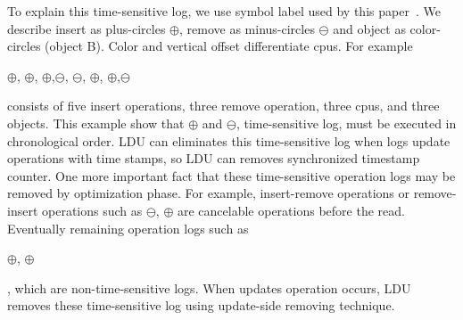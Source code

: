 To explain this time-sensitive log, we use symbol label used by this
paper~\cite{Clements15SCR}.
We describe insert as plus-circles $\oplus$, remove as minus-circles
$\ominus$ and object as color-circles (object B). 
Color and vertical offset differentiate cpus.
For example
\begin{center}
$\oplus$, $\oplus$, $\oplus$,$\ominus$,
$\ominus$, $\oplus$, $\oplus$,$\ominus$
\end{center}
consists of five insert operations, three remove operation, three cpus, and
three objects.
This example show that $\oplus$ and $\ominus$,
time-sensitive log, must be executed in chronological order.
LDU can eliminates this time-sensitive log when logs update operations with time
stamps, so LDU can removes synchronized timestamp counter.
One more important fact that these time-sensitive operation logs may be removed
by optimization phase.
For example, insert-remove operations or remove-insert operations such as 
$\ominus$, $\oplus$ are cancelable operations before
the read.
Eventually remaining operation logs such as
\begin{center}
 $\oplus$, $\oplus$
\end{center}
, which are non-time-sensitive logs.
When updates operation occurs, LDU removes these time-sensitive log using
update-side removing technique.
\fi


